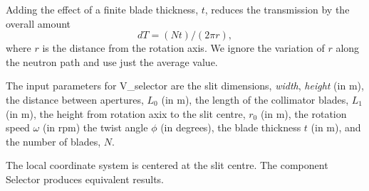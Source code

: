 Adding the effect of a finite blade thickness, $t$, reduces the transmission
by the overall amount
\begin{equation}
dT = (N t) / (2\pi r ) ,
\end{equation}
where $r$ is the distance from the rotation axis. We ignore the variation
of $r$ along the neutron path and use just the average value.

The input parameters for V\_selector are the slit dimensions,
\textit{width}, \textit{height} (in m),
the distance between apertures, $L_0$ (in m), the length of the
collimator blades, $L_1$ (in m), the height from rotation axix to the slit
centre, $r_0$ (in m), the rotation speed $\omega$ (in rpm)
the twist angle $\phi$ (in degrees), the blade thickness $t$ (in m),
and the number of blades, $N$.

The local coordinate system is centered at the slit centre.
The component Selector produces equivalent results.

